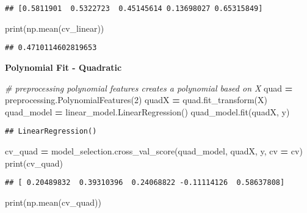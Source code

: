 \documentclass[
]{book}
\newenvironment{Shaded}{\begin{snugshade}}{\end{snugshade}}
\newcommand{\BuiltInTok}[1]{#1}
\newcommand{\CommentTok}[1]{\textcolor[rgb]{0.56,0.35,0.01}{\textit{#1}}}
\newcommand{\DecValTok}[1]{\textcolor[rgb]{0.00,0.00,0.81}{#1}}
\newcommand{\NormalTok}[1]{#1}
\newcommand{\OperatorTok}[1]{\textcolor[rgb]{0.81,0.36,0.00}{\textbf{#1}}}
\begin{document}
\begin{verbatim}
## [0.5811901  0.5322723  0.45145614 0.13698027 0.65315849]
\end{verbatim}

\begin{Shaded}
\begin{Highlighting}[]
\BuiltInTok{print}\NormalTok{(np.mean(cv\_linear))}
\end{Highlighting}
\end{Shaded}

\begin{verbatim}
## 0.4710114602819653
\end{verbatim}

\textbf{Polynomial Fit - Quadratic}

\begin{Shaded}
\begin{Highlighting}[]
\CommentTok{\# preprocessing polynomial features creates a polynomial based on X}
\NormalTok{quad }\OperatorTok{=}\NormalTok{ preprocessing.PolynomialFeatures(}\DecValTok{2}\NormalTok{)}
\NormalTok{quadX }\OperatorTok{=}\NormalTok{ quad.fit\_transform(X)}
\NormalTok{quad\_model }\OperatorTok{=}\NormalTok{ linear\_model.LinearRegression()}
\NormalTok{quad\_model.fit(quadX, y)}
\end{Highlighting}
\end{Shaded}

\begin{verbatim}
## LinearRegression()
\end{verbatim}

\begin{Shaded}
\begin{Highlighting}[]
\NormalTok{cv\_quad }\OperatorTok{=}\NormalTok{ model\_selection.cross\_val\_score(quad\_model, quadX, y, cv }\OperatorTok{=}\NormalTok{ cv)}
\BuiltInTok{print}\NormalTok{(cv\_quad)}
\end{Highlighting}
\end{Shaded}

\begin{verbatim}
## [ 0.20489832  0.39310396  0.24068822 -0.11114126  0.58637808]
\end{verbatim}

\begin{Shaded}
\begin{Highlighting}[]
\BuiltInTok{print}\NormalTok{(np.mean(cv\_quad))}
\end{Highlighting}
\end{Shaded}
\end{document}
